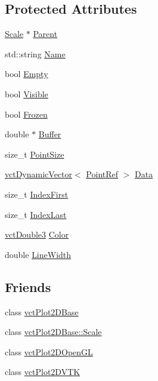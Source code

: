 \subsection*{Protected Attributes}
\begin{DoxyCompactItemize}
\item 
\hyperlink{classvct_plot2_d_base_1_1_scale}{Scale} $\ast$ \hyperlink{classvct_plot2_d_base_1_1_signal_ac96c27d6b67933a136845f700bc4e22c}{Parent}
\item 
std\+::string \hyperlink{classvct_plot2_d_base_1_1_signal_afbc80a39a5230239d4b8d55ea36586ea}{Name}
\item 
bool \hyperlink{classvct_plot2_d_base_1_1_signal_a6cb2569f99ffcc9a3cf4c4be60c94810}{Empty}
\item 
bool \hyperlink{classvct_plot2_d_base_1_1_signal_a7b4f18f8aef3c6353c64d86274c397bd}{Visible}
\item 
bool \hyperlink{classvct_plot2_d_base_1_1_signal_a3290add28cf7247ab5ca703b8b4ba9e7}{Frozen}
\item 
double $\ast$ \hyperlink{classvct_plot2_d_base_1_1_signal_a7b068b5ebd95f73ccafa04c5f7e10b28}{Buffer}
\item 
size\+\_\+t \hyperlink{classvct_plot2_d_base_1_1_signal_a3c18f2c69447f7e310510f9749f9000f}{Point\+Size}
\item 
\hyperlink{classvct_dynamic_vector}{vct\+Dynamic\+Vector}$<$ \hyperlink{classvct_plot2_d_base_1_1_signal_a81b636c91281333319b7f806b8432b92}{Point\+Ref} $>$ \hyperlink{classvct_plot2_d_base_1_1_signal_a67281dea46193aed681097745bb88c81}{Data}
\item 
size\+\_\+t \hyperlink{classvct_plot2_d_base_1_1_signal_ada6747545b67992a43f9b7670ec3be78}{Index\+First}
\item 
size\+\_\+t \hyperlink{classvct_plot2_d_base_1_1_signal_aa1abcd7a414b288732279f5e2868abcd}{Index\+Last}
\item 
\hyperlink{vct_fixed_size_vector_types_8h_a4a89122c9d7f72c3f31fe8126e17c3af}{vct\+Double3} \hyperlink{classvct_plot2_d_base_1_1_signal_a8c99562aebf260551eaf9444b25d7cc9}{Color}
\item 
double \hyperlink{classvct_plot2_d_base_1_1_signal_a9f7fa630a56b5168d0150c2079a40048}{Line\+Width}
\end{DoxyCompactItemize}
\subsection*{Friends}
\begin{DoxyCompactItemize}
\item 
class \hyperlink{classvct_plot2_d_base_1_1_signal_ab1e5a371f284a693f5624104a92ac684}{vct\+Plot2\+D\+Base}
\item 
class \hyperlink{classvct_plot2_d_base_1_1_signal_a2608173200dac970514b9c1d56379e99}{vct\+Plot2\+D\+Base\+::\+Scale}
\item 
class \hyperlink{classvct_plot2_d_base_1_1_signal_a2a04e9e21d2a68342a48b433ff25b7f7}{vct\+Plot2\+D\+Open\+G\+L}
\item 
class \hyperlink{classvct_plot2_d_base_1_1_signal_a61e8f9a436596e1195d2b34b7b5c6f2e}{vct\+Plot2\+D\+V\+T\+K}
\end{DoxyCompactItemize}


